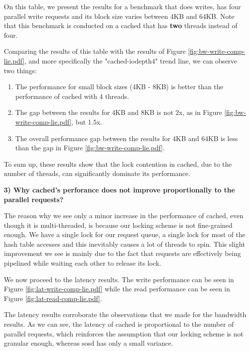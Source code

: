 On this table, we present the results for a benchmark that does writes, has 
four parallel write requests and its block size varies between 4KB and 64KB.  
Note that this benchmark is conducted on a cached that has \textbf{two} threads 
instead of four.

Comparing the results of this table with the results of Figure 
\ref{fig:bw-write-comp-lie.pdf}, and more specifically the "cached-iodepth4" 
trend line, we can observe two things:

\begin{enumerate}
	\item The performance for small block sizes (4KB - 8KB) is better than the 
		performance of cached with 4 threads.
	\item The gap between the results for 4KB and 8KB is not 2x, as in Figure 
		\ref{fig:bw-write-comp-lie.pdf}, but 1.5x.
	\item The overall performance gap between the results for 4KB and 64KB is 
		less than the gap in Figure \ref{fig:bw-write-comp-lie.pdf}.
\end{enumerate}

To sum up, these results show that the lock contention in cached, due to the 
number of threads, can significantly dominate its performance.

\textbf{3) Why cached's perforance does not improve proportionally to the 
	parallel requests?}

The reason why we see only a minor increase in the performance of cached, even 
though it is multi-threaded, is because our locking scheme is not fine-grained 
enough. We have a single lock for our request queue, a single lock for most of 
the hash table accesses and this inevitably causes a lot of threads to spin.  
This slight improvement we see is mainly due to the fact that requests are 
effectively being pipelined while waiting each other to release its lock.  

We now proceed to the latency results. The write performance can be seen in 
Figure \ref{fig:lat-write-comp-lie.pdf} while the read performance can be seen 
in Figure \ref{fig:lat-read-comp-lie.pdf}.

The latency results corroborate the observations that we made for the bandwidth 
results. As we can see, the latency of cached is proportional to the number of 
parallel requests, which reinforces the assumption that our locking scheme is 
not granular enough, whereas sosd has only a small variance.

